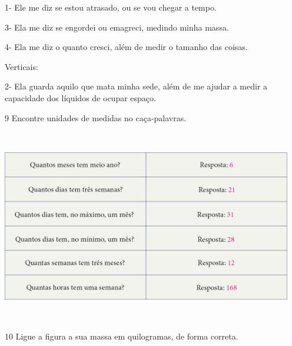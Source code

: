 1- Ele me diz se estou atrasado, ou se vou chegar a tempo.

3- Ela me diz se engordei ou emagreci, medindo minha massa.

4- Ela me diz o quanto cresci, além de medir o tamanho das coisas.

Verticais:

2- Ela guarda aquilo que mata minha sede, além de me ajudar a medir a
capacidade dos líquidos de ocupar espaço.


\num{9} Encontre unidades de medidas no caça-palavras.

\includegraphics[width=5.00000in,height=3.32292in]{media/image50.png}


\num{10} Ligue a figura a sua massa em quilogramas, de forma correta.


